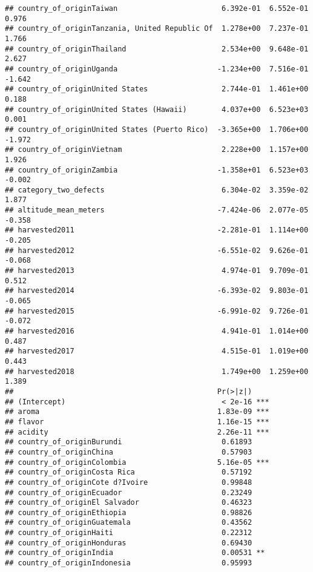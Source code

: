 \documentclass[
]{article}
\begin{document}
\begin{verbatim}
## country_of_originTaiwan                        6.392e-01  6.552e-01   0.976
## country_of_originTanzania, United Republic Of  1.278e+00  7.237e-01   1.766
## country_of_originThailand                      2.534e+00  9.648e-01   2.627
## country_of_originUganda                       -1.234e+00  7.516e-01  -1.642
## country_of_originUnited States                 2.744e-01  1.461e+00   0.188
## country_of_originUnited States (Hawaii)        4.037e+00  6.523e+03   0.001
## country_of_originUnited States (Puerto Rico)  -3.365e+00  1.706e+00  -1.972
## country_of_originVietnam                       2.228e+00  1.157e+00   1.926
## country_of_originZambia                       -1.358e+01  6.523e+03  -0.002
## category_two_defects                           6.304e-02  3.359e-02   1.877
## altitude_mean_meters                          -7.424e-06  2.077e-05  -0.358
## harvested2011                                 -2.281e-01  1.114e+00  -0.205
## harvested2012                                 -6.551e-02  9.626e-01  -0.068
## harvested2013                                  4.974e-01  9.709e-01   0.512
## harvested2014                                 -6.393e-02  9.803e-01  -0.065
## harvested2015                                 -6.991e-02  9.726e-01  -0.072
## harvested2016                                  4.941e-01  1.014e+00   0.487
## harvested2017                                  4.515e-01  1.019e+00   0.443
## harvested2018                                  1.749e+00  1.259e+00   1.389
##                                               Pr(>|z|)    
## (Intercept)                                    < 2e-16 ***
## aroma                                         1.83e-09 ***
## flavor                                        1.16e-15 ***
## acidity                                       2.26e-11 ***
## country_of_originBurundi                       0.61893    
## country_of_originChina                         0.57903    
## country_of_originColombia                     5.16e-05 ***
## country_of_originCosta Rica                    0.57192    
## country_of_originCote d?Ivoire                 0.99848    
## country_of_originEcuador                       0.23249    
## country_of_originEl Salvador                   0.46323    
## country_of_originEthiopia                      0.98826    
## country_of_originGuatemala                     0.43562    
## country_of_originHaiti                         0.22312    
## country_of_originHonduras                      0.69430    
## country_of_originIndia                         0.00531 ** 
## country_of_originIndonesia                     0.95993    

\end{verbatim}
\end{document}
